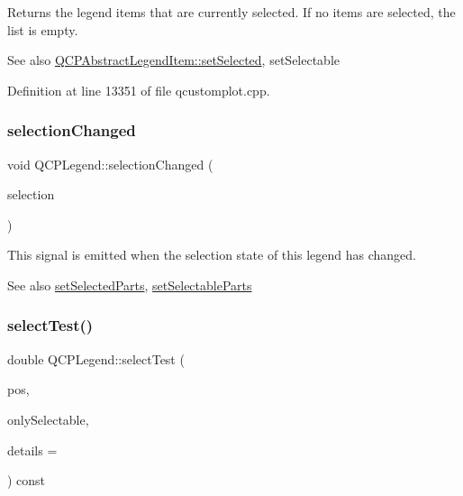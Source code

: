 Returns the legend items that are currently selected. If no items are selected, the list is empty.

\begin{DoxySeeAlso}{See also}
\hyperlink{class_q_c_p_abstract_legend_item_a6eed93b0ab99cb3eabb043fb08179c2b}{Q\+C\+P\+Abstract\+Legend\+Item\+::set\+Selected}, set\+Selectable 
\end{DoxySeeAlso}


Definition at line 13351 of file qcustomplot.\+cpp.

\mbox{\label{class_q_c_p_legend_a82c88464edac07a9eefaf3906268df3b}} 
\subsubsection{\texorpdfstring{selection\+Changed}{selectionChanged}}
{\footnotesize\ttfamily void Q\+C\+P\+Legend\+::selection\+Changed (\begin{DoxyParamCaption}\item[{Q\+C\+P\+Legend\+::\+Selectable\+Parts}]{selection }\end{DoxyParamCaption})\hspace{0.3cm}{\ttfamily [signal]}}

This signal is emitted when the selection state of this legend has changed.

\begin{DoxySeeAlso}{See also}
\hyperlink{class_q_c_p_legend_a2aee309bb5c2a794b1987f3fc97f8ad8}{set\+Selected\+Parts}, \hyperlink{class_q_c_p_legend_a9ce60aa8bbd89f62ae4fa83ac6c60110}{set\+Selectable\+Parts} 
\end{DoxySeeAlso}
\mbox{\label{class_q_c_p_legend_acd7be544c81324e391cfa6be9c413c01}} 
\subsubsection{\texorpdfstring{select\+Test()}{selectTest()}}
{\footnotesize\ttfamily double Q\+C\+P\+Legend\+::select\+Test (\begin{DoxyParamCaption}\item[{const Q\+PointF \&}]{pos,  }\item[{bool}]{only\+Selectable,  }\item[{Q\+Variant $\ast$}]{details = {} }\end{DoxyParamCaption}) const\hspace{0.3cm}{\ttfamily [virtual]}}


